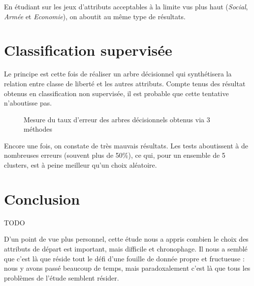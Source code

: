 En étudiant sur les jeux d'attributs \og acceptables à la limite \fg vus plus haut (\emph{Social}, \emph{Armée} et \emph{Economie}), on aboutit au même type de résultats.

\section{Classification supervisée}
Le principe est cette fois de réaliser un arbre décisionnel qui synthétisera la relation entre classe de liberté et les autres attributs. Compte tenus des résultat obtenus en classification non supervisée, il est probable que cette tentative n'aboutisse pas.

\begin{figure}[H]
	\centering
	\caption{Mesure du taux d'erreur des arbres décisionnels obtenus via 3 méthodes}
\end{figure}

Encore une fois, on constate de très mauvais résultats. Les tests aboutissent à de nombreuses erreurs (souvent plus de 50\%), ce qui, pour un ensemble de 5 clusters, est à peine meilleur qu'un choix aléatoire.


\section{Conclusion}

{\huge TODO}

D'un point de vue plus personnel, cette étude nous a appris combien le choix des attributs de départ est important, mais difficile et chronophage. Il nous a semblé que c'est là que réside tout le défi d'une fouille de donnée propre et fructueuse : nous y avons passé beaucoup de temps, mais paradoxalement c'est là que tous les problèmes de l'étude semblent résider.

